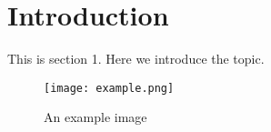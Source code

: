 \section{Introduction}
This is section 1. Here we introduce the topic.

\begin{figure}[h]
    \centering
    \texttt{[image: example.png]}
    \caption{An example image}
\end{figure}